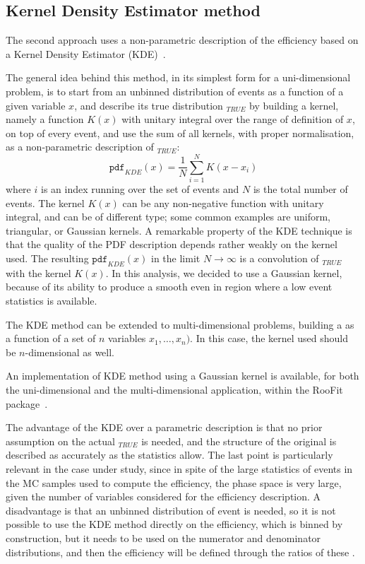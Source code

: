 \subsection{Kernel Density Estimator method}\label{sec:eff_kde}
The second approach uses a non-parametric description of the efficiency based on a Kernel Density Estimator (KDE)~\cite{opac-b1089297,Cranmer:2000du}.

The general idea behind this method, in its simplest form for a uni-dimensional problem, is to start from an unbinned distribution of events as a function of a given variable $x$, and describe its true distribution \pdf$_{TRUE}$ by building a kernel, namely a function $K(x)$ with unitary integral over the range of definition of $x$, on top of every event, and use the sum of all kernels, with proper normalisation, as a non-parametric description of \pdf$_{TRUE}$:
\begin{equation}\label{eq:KDE}
    \mathtt{pdf}_{KDE}(x)=\frac{1}{N}\sum_{i=1}^{N} K(x-x_i)
\end{equation}
where $i$ is an index running over the set of events and $N$ is the total number of events.
The kernel $K(x)$ can be any non-negative function with unitary integral, and can be of different type; some common examples are uniform, triangular, or Gaussian kernels.
A remarkable property of the KDE technique is that the quality of the PDF description depends rather weakly on the kernel used.
The resulting $\mathtt{pdf}_{KDE}(x)$ in the limit $N\to\infty$ is a convolution of \pdf$_{TRUE}$ with the kernel $K(x)$.
In this analysis, we decided to use a Gaussian kernel, because of its ability to produce a smooth \pdf even in region where a low event statistics is available.

The KDE method can be extended to multi-dimensional problems, building a \pdf as a function of a set of $n$ variables $x_1,\ldots,x_n)$.
In this case, the kernel used should be $n$-dimensional as well.

An implementation of KDE method using a Gaussian kernel is available, for both the uni-dimensional and the multi-dimensional application, within the {\sc RooFit} package~\cite{RooFit}.

The advantage of the KDE over a parametric description is that no prior assumption on the actual \pdf$_{TRUE}$ is needed, and the structure of the original \pdf is described as accurately as the statistics allow.
The last point is particularly relevant in the case under study, since in spite of the large statistics of events in the MC samples used to compute the efficiency, the phase space is very large, given the number of variables considered for the efficiency description.
A disadvantage is that an unbinned distribution of event is needed, so it is not possible to use the KDE method directly on the efficiency, which is binned by construction, but it needs to be used on the numerator and denominator distributions, and then the efficiency will be defined through the ratios of these \pdfs.

